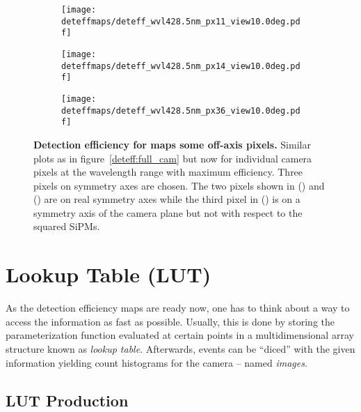 \begin{figure}[H]
	\centering
	\begin{subfigure}[t]{0.705\textwidth}
		\texttt{[image: deteffmaps/deteff\_wvl428.5nm\_px11\_view10.0deg.pdf]}
		\label{deteff:offaxis_px:1}
	\end{subfigure}
	\hfill
	\begin{subfigure}[t]{0.705\textwidth}
		\texttt{[image: deteffmaps/deteff\_wvl428.5nm\_px14\_view10.0deg.pdf]}
		\label{deteff:offaxis_px:2}
	\end{subfigure}
	\vfill
	\begin{subfigure}[t]{0.705\textwidth}
		\texttt{[image: deteffmaps/deteff\_wvl428.5nm\_px36\_view10.0deg.pdf]}
		\label{deteff:offaxis_px:3}
	\end{subfigure}
	\caption[Detection efficiency maps for some off-axis pixels]{\textbf{Detection efficiency for maps some off-axis pixels.} Similar plots as in figure~\ref{deteff:full_cam} but now for individual camera pixels at the wavelength range with maximum efficiency. Three pixels on symmetry axes are chosen. The two pixels shown in () and () are on real symmetry axes while the third pixel in () is on a symmetry axis of the camera plane but not with respect to the squared SiPMs.}
	\label{deteff:offaxis_px}		
\end{figure}

\section{Lookup Table (LUT)}

As the detection efficiency maps are ready now, one has to think about a way to access the information as fast as possible. Usually, this is done by storing the parameterization function evaluated at certain points in a multidimensional array structure known as \textit{lookup table}. Afterwards, events can be \enquote{diced} with the given information yielding count histograms for the camera -- named \textit{images}.

\subsection{LUT Production}\label{sec:lut_production}

